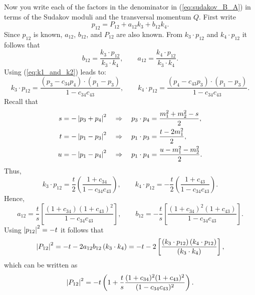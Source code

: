 Now you write each of the factors in the denominator in (\ref{eq:sudakov_B_A}) in terms of the Sudakov moduli and the transversal momentum $Q$. First write
\begin{equation}
	p_{12} = P_{12} + a_{12} k_{3} + b_{12} k_{4}.
\end{equation}
Since $p_{12}$ is known, $a_{12}$, $b_{12}$, and $P_{12}$ are also known. From $k_{3} \cdot p_{12}$ and $k_{4} \cdot p_{12}$ it follows that
\begin{equation}
	b_{12} = \frac{k_{3} \cdot p_{12}}{k_{3} \cdot k_{4}}, \qquad a_{12} = \frac{k_{4} \cdot p_{12}}{k_{3} \cdot k_{4}}.
\end{equation}
Using (\ref{eq:k1_and_k2}) leads to:
\begin{equation}
	k_{3} \cdot p_{12} = \frac{(p_{3} - c_{34} p_{4}) \cdot (p_{1} - p_{3})}{1 - c_{34} c_{43}}, \qquad k_{4} \cdot p_{12} = \frac{(p_{4} - c_{43} p_{3}) \cdot (p_{1} - p_{3})}{1 - c_{34} c_{43}}.
\end{equation}
Recall that
\begin{align}
	s = -\left\lvert p_{3} + p_{4} \right\rvert^{2} \quad &\Rightarrow \quad p_{3} \cdot p_{4} = \frac{m_{1}^{2} + m_{2}^{2} - s}{2}, \\
	t = -\left\lvert p_{1} - p_{3} \right\rvert^{2} \quad &\Rightarrow \quad p_{1} \cdot p_{3} = \frac{t - 2m_{1}^{2}}{2}, \\
	u = -\left\lvert p_{1} - p_{4} \right\rvert^{2} \quad &\Rightarrow \quad p_{1} \cdot p_{4} = \frac{u - m_{1}^{2} - m_{2}^{2}}{2}. \\
\end{align}
Thus,
\begin{equation}
	k_{3} \cdot p_{12} = \frac{t}{2} \left( \frac{1 + c_{34}}{1 - c_{34} c_{43}} \right), \qquad k_{4} \cdot p_{12} = -\frac{t}{2} \left( \frac{1 + c_{43}}{1 - c_{34} c_{43}} \right).
\end{equation}
Hence,
\begin{equation}
	a_{12} = \frac{t}{s} \left[ \frac{(1 + c_{34}) (1 + c_{43})^{2}}{1 - c_{34} c_{43}} \right], \qquad b_{12} = -\frac{t}{s} \left[ \frac{(1 + c_{34})^{2} (1 + c_{43})}{1 - c_{34} c_{43}} \right].
\end{equation}
Using $\left\lvert p_{12} \right\rvert^{2} = -t$ it follows that
\begin{equation}
	\left\lvert P_{12} \right\rvert^{2} = -t - 2 a_{12} b_{12} \left(k_{3} \cdot k_{4}\right) = -t - 2 \left[ \frac{\left(k_{3} \cdot p_{12}\right) \left(k_{4} \cdot p_{12}\right)}{\left(k_{3} \cdot k_{4}\right)} \right],
\end{equation}
which can be written as
\begin{equation}
	\left\lvert P_{12} \right\rvert^{2} = -t \left( 1 + \frac{t}{s} \frac{(1 + c_{34})^{2}(1 + c_{43})^{2}}{(1 - c_{34} c_{43})^{2}} \right).
\end{equation}
